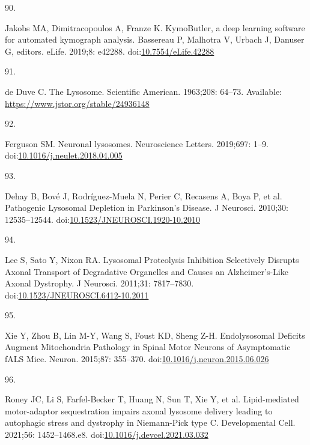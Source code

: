 \documentclass[
  12pt,
  a4paper,
]{book}
\newlength{\cslhangindent}
\newlength{\csllabelwidth}
\newlength{\cslentryspacingunit} %
\newenvironment{CSLReferences}[2] %
 {%
  \setlength{\parindent}{0pt}
  \ifodd #1
  \let\oldpar\par
  \def\par{\hangindent=\cslhangindent\oldpar}
  \fi
  \setlength{\parskip}{#2\cslentryspacingunit}
 }%
 {}
\newcommand{\CSLLeftMargin}[1]{\parbox[t]{\csllabelwidth}{#1}}
\newcommand{\CSLRightInline}[1]{\parbox[t]{\linewidth - \csllabelwidth}{#1}\break}
\begin{document}
\begin{CSLReferences}{0}{0}
\leavevmode{}%
\CSLLeftMargin{90. }%
\CSLRightInline{Jakobs MA, Dimitracopoulos A, Franze K. {KymoButler}, a deep learning software for automated kymograph analysis. Bassereau P, Malhotra V, Urbach J, Danuser G, editors. eLife. 2019;8: e42288. doi:\href{https://doi.org/10.7554/eLife.42288}{10.7554/eLife.42288}}

\leavevmode{}%
\CSLLeftMargin{91. }%
\CSLRightInline{de Duve C. The {Lysosome}. Scientific American. 1963;208: 64--73. Available: \url{https://www.jstor.org/stable/24936148}}

\leavevmode{}%
\CSLLeftMargin{92. }%
\CSLRightInline{Ferguson SM. Neuronal lysosomes. Neuroscience Letters. 2019;697: 1--9. doi:\href{https://doi.org/10.1016/j.neulet.2018.04.005}{10.1016/j.neulet.2018.04.005}}

\leavevmode{}%
\CSLLeftMargin{93. }%
\CSLRightInline{Dehay B, Bové J, Rodríguez-Muela N, Perier C, Recasens A, Boya P, et al. Pathogenic {Lysosomal Depletion} in {Parkinson}'s {Disease}. J Neurosci. 2010;30: 12535--12544. doi:\href{https://doi.org/10.1523/JNEUROSCI.1920-10.2010}{10.1523/JNEUROSCI.1920-10.2010}}

\leavevmode{}%
\CSLLeftMargin{94. }%
\CSLRightInline{Lee S, Sato Y, Nixon RA. Lysosomal {Proteolysis Inhibition Selectively Disrupts Axonal Transport} of {Degradative Organelles} and {Causes} an {Alzheimer}'s-{Like Axonal Dystrophy}. J Neurosci. 2011;31: 7817--7830. doi:\href{https://doi.org/10.1523/JNEUROSCI.6412-10.2011}{10.1523/JNEUROSCI.6412-10.2011}}

\leavevmode{}%
\CSLLeftMargin{95. }%
\CSLRightInline{Xie Y, Zhou B, Lin M-Y, Wang S, Foust KD, Sheng Z-H. Endolysosomal {Deficits Augment Mitochondria Pathology} in {Spinal Motor Neurons} of {Asymptomatic fALS Mice}. Neuron. 2015;87: 355--370. doi:\href{https://doi.org/10.1016/j.neuron.2015.06.026}{10.1016/j.neuron.2015.06.026}}

\leavevmode{}%
\CSLLeftMargin{96. }%
\CSLRightInline{Roney JC, Li S, Farfel-Becker T, Huang N, Sun T, Xie Y, et al. Lipid-mediated motor-adaptor sequestration impairs axonal lysosome delivery leading to autophagic stress and dystrophy in {Niemann-Pick} type {C}. Developmental Cell. 2021;56: 1452--1468.e8. doi:\href{https://doi.org/10.1016/j.devcel.2021.03.032}{10.1016/j.devcel.2021.03.032}}


\end{CSLReferences}
\end{document}
